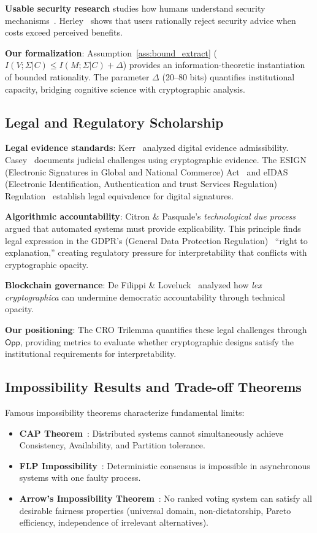 \documentclass{ieeeaccess}
\newcommand{\Opp}{\mathsf{Opp}}
\begin{document}
\textbf{Usable security research} studies how humans understand security mechanisms~\cite{Bonneau12,Cranor05}. Herley~\cite{Herley09} shows that users rationally reject security advice when costs exceed perceived benefits.

\textbf{Our formalization}: Assumption~\ref{ass:bound_extract} ($I(V;\Sigma|C) \leq I(M;\Sigma|C) + \Delta$) provides an information-theoretic instantiation of bounded rationality. The parameter $\Delta$ (20--80 bits) quantifies institutional capacity, bridging cognitive science with cryptographic analysis.

\subsection{Legal and Regulatory Scholarship}

\textbf{Legal evidence standards}: Kerr~\cite{Kerr04} analyzed digital evidence admissibility. Casey~\cite{Casey10} documents judicial challenges using cryptographic evidence. The ESIGN (Electronic Signatures in Global and National Commerce) Act~\cite{ESIGN00} and eIDAS (Electronic Identification, Authentication and trust Services Regulation) Regulation~\cite{eIDAS14} establish legal equivalence for digital signatures.

\textbf{Algorithmic accountability}: Citron \& Pasquale's \emph{technological due process}~\cite{Citron14} argued that automated systems must provide explicability. This principle finds legal expression in the GDPR's (General Data Protection Regulation)~\cite{GDPR16} ``right to explanation,'' creating regulatory pressure for interpretability that conflicts with cryptographic opacity.

\textbf{Blockchain governance}: De Filippi \& Loveluck~\cite{DeFilippi16} analyzed how \emph{lex cryptographica} can undermine democratic accountability through technical opacity.

\textbf{Our positioning}: The CRO Trilemma quantifies these legal challenges through $\Opp$, providing metrics to evaluate whether cryptographic designs satisfy the institutional requirements for interpretability.

\subsection{Impossibility Results and Trade-off Theorems}

Famous impossibility theorems characterize fundamental limits:
\begin{itemize}
\item \textbf{CAP Theorem}~\cite{Brewer00}: Distributed systems cannot simultaneously achieve Consistency, Availability, and Partition tolerance.
\item \textbf{FLP Impossibility}~\cite{FLP85}: Deterministic consensus is impossible in asynchronous systems with one faulty process.
\item \textbf{Arrow's Impossibility Theorem}~\cite{Arrow50}: No ranked voting system can satisfy all desirable fairness properties (universal domain, non-dictatorship, Pareto efficiency, independence of irrelevant alternatives).
\end{itemize}
\end{document}
